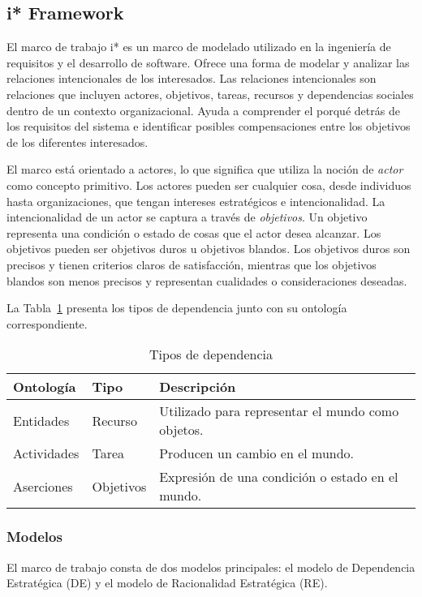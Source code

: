 \subsection{i* Framework}
El marco de trabajo i* \parencite{yu1995} es un marco de modelado utilizado en la ingeniería de requisitos y el desarrollo de software.
Ofrece una forma de modelar y analizar las relaciones intencionales de los interesados.
Las relaciones intencionales son relaciones que incluyen actores, objetivos, tareas, recursos y dependencias sociales dentro de un contexto organizacional.
Ayuda a comprender el porqué detrás de los requisitos del sistema e identificar posibles compensaciones entre los objetivos de los diferentes interesados.

El marco está orientado a actores, lo que significa que utiliza la noción de \textit{actor} como concepto primitivo.
Los actores pueden ser cualquier cosa, desde individuos hasta organizaciones, que tengan intereses estratégicos e intencionalidad.
La intencionalidad de un actor se captura a través de \textit{objetivos}.
Un objetivo representa una condición o estado de cosas que el actor desea alcanzar.
Los objetivos pueden ser objetivos duros u objetivos blandos.
Los objetivos duros son precisos y tienen criterios claros de satisfacción, mientras que los objetivos blandos son menos precisos y representan cualidades o consideraciones deseadas.

La Tabla~\ref{tab:istarDependencyTypes} presenta los tipos de dependencia junto con su ontología correspondiente.
\begin{table}
	\caption{Tipos de dependencia}\label{tab:istarDependencyTypes}
	\begin{tabularx}{\textwidth}{@{} llX @{}}
		\toprule
		\textbf{Ontología} & \textbf{Tipo} & \textbf{Descripción} \\
		\midrule
		Entidades & Recurso & Utilizado para representar el mundo como objetos. \\
		Actividades & Tarea & Producen un cambio en el mundo. \\
		Aserciones & Objetivos & Expresión de una condición o estado en el mundo. \\
		\bottomrule
	\end{tabularx}
\end{table}

\subsubsection{Modelos}
El marco de trabajo consta de dos modelos principales: el modelo de Dependencia Estratégica (DE) y el modelo de Racionalidad Estratégica (RE).

